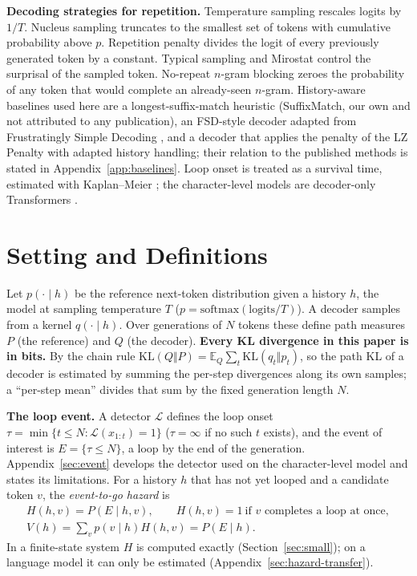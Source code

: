 \documentclass[make,article,submit,pdftex]{Definitions/mdpi}
\providecommand{\KL}{}\renewcommand{\KL}{\mathrm{KL}}
\providecommand{\E}{}\renewcommand{\E}{\mathbb{E}}
\begin{document}
\textbf{Decoding strategies for repetition.} Temperature sampling rescales logits by $1/T$. Nucleus sampling \cite{holtzman2020curious} truncates to the smallest set of tokens with cumulative probability above $p$. Repetition penalty \cite{keskar2019ctrl} divides the logit of every previously generated token by a constant. Typical sampling \cite{meister2023typical} and Mirostat \cite{basu2021mirostat} control the surprisal of the sampled token. No-repeat $n$-gram blocking \cite{paulus2018deep} zeroes the probability of any token that would complete an already-seen $n$-gram. History-aware baselines used here are a longest-suffix-match heuristic (SuffixMatch, our own and not attributed to any publication), an FSD-style decoder adapted from Frustratingly Simple Decoding \cite{yang2023frustratingly}, and a decoder that applies the penalty of the LZ Penalty \cite{ginart2025lzpenalty} with adapted history handling; their relation to the published methods is stated in Appendix~\ref{app:baselines}. Loop onset is treated as a survival time, estimated with Kaplan--Meier \cite{kaplan1958nonparametric}; the character-level models are decoder-only Transformers \cite{vaswani2017attention}.

\section{Setting and Definitions}\label{sec:setup}

Let $p(\cdot\mid h)$ be the reference next-token distribution given a history $h$, the model at sampling temperature $T$ ($p=\mathrm{softmax}(\mathrm{logits}/T)$). A decoder samples from a kernel $q(\cdot\mid h)$. Over generations of $N$ tokens these define path measures $P$ (the reference) and $Q$ (the decoder). \textbf{Every KL divergence in this paper is in bits.} By the chain rule $\KL(Q\Vert P)=\E_Q\sum_t \KL(q_t\Vert p_t)$, so the path KL of a decoder is estimated by summing the per-step divergences along its own samples; a ``per-step mean'' divides that sum by the fixed generation length $N$.

\textbf{The loop event.} A detector $\mathcal{L}$ defines the loop onset $\tau=\min\{t\le N:\mathcal{L}(x_{1:t})=1\}$ ($\tau=\infty$ if no such $t$ exists), and the event of interest is $E=\{\tau\le N\}$, a loop by the end of the generation. Appendix~\ref{sec:event} develops the detector used on the character-level model and states its limitations. For a history $h$ that has not yet looped and a candidate token $v$, the \emph{event-to-go hazard} is
\begin{gather*}
H(h,v)=P(E\mid h,v),\qquad H(h,v)=1\ \text{if $v$ completes a loop at once},\\
V(h)=\textstyle\sum_v p(v\mid h)H(h,v)=P(E\mid h).
\end{gather*}
In a finite-state system $H$ is computed exactly (Section~\ref{sec:small}); on a language model it can only be estimated (Appendix~\ref{sec:hazard-transfer}).
\end{document}
